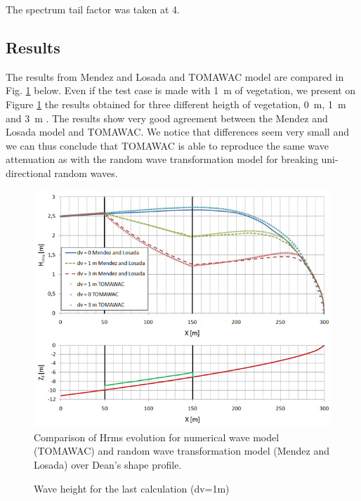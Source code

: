 The spectrum tail factor was taken at 4.

\subsection{Results}
%
 The results from Mendez and Losada and TOMAWAC model are compared in Fig. \ref{figresvito} below.
Even if the test case is made with 1~m of vegetation, we present on Figure \ref{figresvito} the results obtained for three different heigth of vegetation, 0~m, 1~m and 3~m \cite{Bacchi2014}.
The results show very good agreement between the Mendez  and Losada model \cite{Mendez2004} and TOMAWAC. We notice that differences seem very small and we can thus conclude that TOMAWAC is able to reproduce the same wave attenuation as with the random wave transformation model for breaking uni-directional random waves.
\begin{figure} [!h]
\centering
\includegraphics[scale = 0.65]{resdean.png}
 \caption{Comparison of Hrms evolution for numerical wave model (TOMAWAC) and random wave transformation model (Mendez and Losada) over Dean’s shape profile.}
\label{figresvito}
\end{figure}

\begin{figure} [!h]
\centering
{}
 \caption{Wave height for the last calculation (dv=1m)}
\label{figrescalc}
\end{figure}



